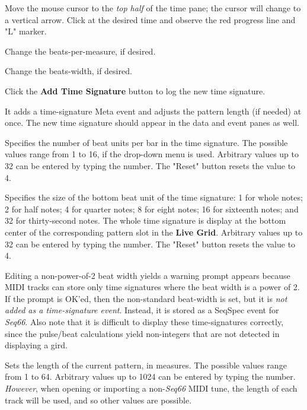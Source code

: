    \begin{enumber}
      \item Move the mouse cursor to the \textsl{top half} of the time pane;
         the cursor will change to a vertical arrow. Click at the desired time
         and observe the red progress line and "L" marker.
      \item Change the beats-per-measure, if desired.
      \item Change the beats-width, if desired.
      \item Click the \textbf{Add Time Signature} button to log the
         new time signature.
   \end{enumber}

   It adds a time-signature Meta event and adjusts the pattern
   length (if needed) at once.
   The new time signature should appear in the data and event panes as well.

   Specifies the number of beat units per bar in the time signature.
   The possible values range from 1 to 16, if the drop-down menu is used.
   Arbitrary values up to 32 can be entered by typing the number.
   The "Reset" button resets the value to 4.

   Specifies the size of the bottom beat unit of the time signature:
   1 for whole notes; 2 for half notes; 4 for quarter notes; 8 for eight notes;
   16 for sixteenth notes; and 32 for thirty-second notes.
   The whole time signature is display at the bottom center of the
   corresponding pattern slot in the \textbf{Live Grid}.
   Arbitrary values up to 32 can be entered by typing the number.
   The "Reset" button resets the value to 4.

   Editing a non-power-of-2 beat width yields a warning prompt appears because MIDI tracks can store only time
   signatures where the beat width is a power of 2.
   If the prompt is OK'ed, then the non-standard beat-width is set,
   but it is \textsl{not added as a time-signature event}.
   Instead, it is stored as a SeqSpec event for \textsl{Seq66}.
   Also note that it is difficult to display these time-signatures
   correctly, since the pulse/beat calculations yield non-integers that are
   not detected in displaying a gird.

   Sets the length of the current pattern, in measures.
   The possible values range from 1 to 64.
   Arbitrary values up to 1024 can be entered by typing the number.
   \textsl{However}, when opening or importing a non-\textsl{Seq66}
   MIDI tune, the length of each track will be used, and so other values
   are possible.

